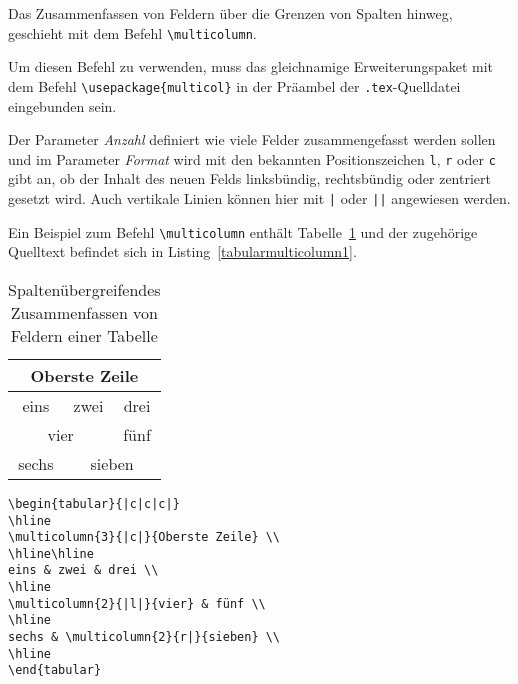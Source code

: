 Das Zusammenfassen von Feldern über die Grenzen von Spalten hinweg, geschieht mit dem Befehl \verb!\multicolumn!. 


Um diesen Befehl zu verwenden, muss das gleichnamige Erweiterungspaket mit dem Befehl \verb!\usepackage{multicol}! in der Präambel der \verb!.tex!-Quelldatei eingebunden sein.

Der Parameter \textsl{Anzahl} definiert wie viele Felder zusammengefasst werden sollen und im Parameter \textsl{Format} wird mit den bekannten Positionszeichen \verb!l!, \verb!r! oder \verb!c! gibt an, ob der Inhalt des neuen Felds linksbündig, rechtsbündig oder zentriert gesetzt wird. Auch vertikale Linien können hier mit \verb!|! oder \verb!||! angewiesen werden.

Ein Beispiel zum Befehl \verb!\multicolumn! enthält Tabelle~\ref{Tabelle_Multicolumn1} und der zugehörige Quelltext befindet sich in Listing~\ref{tabularmulticolumn1}.


\begin{table}[h!tb]
\centering
\caption{Spaltenübergreifendes Zusammenfassen von Feldern einer Tabelle}
\label{Tabelle_Multicolumn1}
\begin{tabular}{|c|c|c|}
\hline
\multicolumn{3}{|c|}{Oberste Zeile} \\
\hline\hline
eins & zwei & drei \\
\hline
\multicolumn{2}{|c|}{vier} & fünf \\
\hline
sechs & \multicolumn{2}{c|}{sieben} \\
\hline
\end{tabular}
\end{table}


\begin{lstlisting}[caption={Der Befehl \texttt{multicolumn} kann Felder über Spalten hinweg zusammenfassen},label=tabularmulticolumn1, style=customlatex]
\begin{tabular}{|c|c|c|}
\hline
\multicolumn{3}{|c|}{Oberste Zeile} \\
\hline\hline
eins & zwei & drei \\
\hline
\multicolumn{2}{|l|}{vier} & fünf \\
\hline
sechs & \multicolumn{2}{r|}{sieben} \\
\hline
\end{tabular}
\end{lstlisting}

